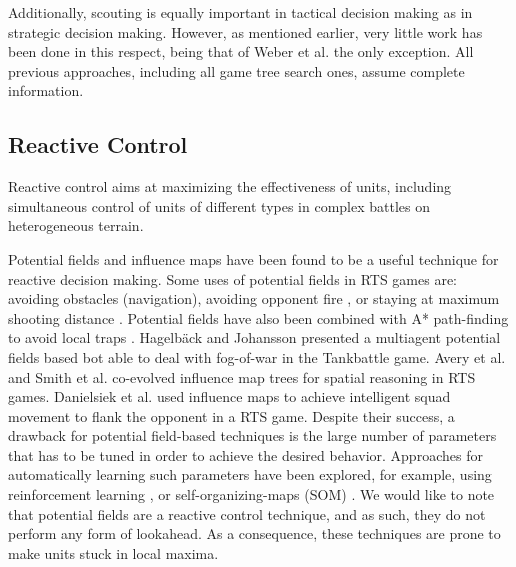 \documentclass[journal]{IEEEtran}
\begin{document}

Additionally, scouting is equally important in tactical decision making as in strategic decision making. However, as mentioned earlier, very little work has been done in this respect, being that of Weber et al. \cite{WeberAIIDE11} the only exception. All previous approaches, including all game tree search ones, assume complete information.


\subsection{Reactive Control}

Reactive control %
aims at maximizing the effectiveness of units, including simultaneous control of units of different types in complex battles on heterogeneous terrain. 

Potential fields and influence maps have been found to be a useful technique for reactive decision making. Some uses of potential fields in RTS games are: avoiding obstacles (navigation), avoiding opponent fire \cite{uriarte2012kiting}, or staying at maximum shooting distance \cite{Hagelback09}. Potential fields have also been combined with A* path-finding to avoid local traps \cite{Hagelback12}. Hagelb\"{a}ck and Johansson \cite{HagelbackJ08} presented a multiagent potential fields based bot able to deal with fog-of-war in the Tankbattle game. Avery et al. \cite{Avery09} and Smith et al. \cite{SmithCIG10} co-evolved influence map trees for spatial reasoning in RTS games. Danielsiek et al. \cite{Danielsiek_2008} used influence maps to achieve intelligent squad movement to flank the opponent in a RTS game. Despite their success, a drawback for potential field-based techniques is the large number of parameters that has to be tuned in order to achieve the desired behavior. Approaches for automatically learning such parameters have been explored, for example, using reinforcement learning \cite{Liu_2008}, or self-organizing-maps (SOM) \cite{teamCompositionRTS}. We would like to note that potential fields are a reactive control technique, and as such, they do not perform any form of lookahead. As a consequence, these techniques are prone to make units stuck in local maxima. 
\end{document}
